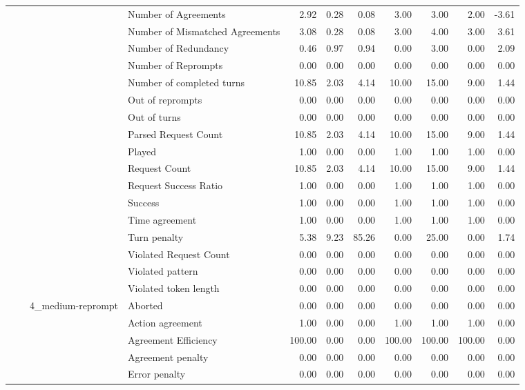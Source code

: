 \begin{tabular}{llllrrrrrrr}
 &  &  & Number of Agreements & 2.92 & 0.28 & 0.08 & 3.00 & 3.00 & 2.00 & -3.61 \\
 &  &  & Number of Mismatched Agreements & 3.08 & 0.28 & 0.08 & 3.00 & 4.00 & 3.00 & 3.61 \\
 &  &  & Number of Redundancy & 0.46 & 0.97 & 0.94 & 0.00 & 3.00 & 0.00 & 2.09 \\
 &  &  & Number of Reprompts & 0.00 & 0.00 & 0.00 & 0.00 & 0.00 & 0.00 & 0.00 \\
 &  &  & Number of completed turns & 10.85 & 2.03 & 4.14 & 10.00 & 15.00 & 9.00 & 1.44 \\
 &  &  & Out of reprompts & 0.00 & 0.00 & 0.00 & 0.00 & 0.00 & 0.00 & 0.00 \\
 &  &  & Out of turns & 0.00 & 0.00 & 0.00 & 0.00 & 0.00 & 0.00 & 0.00 \\
 &  &  & Parsed Request Count & 10.85 & 2.03 & 4.14 & 10.00 & 15.00 & 9.00 & 1.44 \\
 &  &  & Played & 1.00 & 0.00 & 0.00 & 1.00 & 1.00 & 1.00 & 0.00 \\
 &  &  & Request Count & 10.85 & 2.03 & 4.14 & 10.00 & 15.00 & 9.00 & 1.44 \\
 &  &  & Request Success Ratio & 1.00 & 0.00 & 0.00 & 1.00 & 1.00 & 1.00 & 0.00 \\
 &  &  & Success & 1.00 & 0.00 & 0.00 & 1.00 & 1.00 & 1.00 & 0.00 \\
 &  &  & Time agreement & 1.00 & 0.00 & 0.00 & 1.00 & 1.00 & 1.00 & 0.00 \\
 &  &  & Turn penalty & 5.38 & 9.23 & 85.26 & 0.00 & 25.00 & 0.00 & 1.74 \\
 &  &  & Violated Request Count & 0.00 & 0.00 & 0.00 & 0.00 & 0.00 & 0.00 & 0.00 \\
 &  &  & Violated pattern & 0.00 & 0.00 & 0.00 & 0.00 & 0.00 & 0.00 & 0.00 \\
 &  &  & Violated token length & 0.00 & 0.00 & 0.00 & 0.00 & 0.00 & 0.00 & 0.00 \\
\cline{3-11}
 &  & \multirow[t]{27}{*}{4_medium-reprompt} & Aborted & 0.00 & 0.00 & 0.00 & 0.00 & 0.00 & 0.00 & 0.00 \\
 &  &  & Action agreement & 1.00 & 0.00 & 0.00 & 1.00 & 1.00 & 1.00 & 0.00 \\
 &  &  & Agreement Efficiency & 100.00 & 0.00 & 0.00 & 100.00 & 100.00 & 100.00 & 0.00 \\
 &  &  & Agreement penalty & 0.00 & 0.00 & 0.00 & 0.00 & 0.00 & 0.00 & 0.00 \\
 &  &  & Error penalty & 0.00 & 0.00 & 0.00 & 0.00 & 0.00 & 0.00 & 0.00 \\

\end{tabular}
